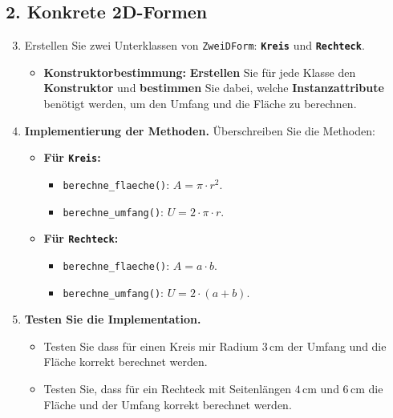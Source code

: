 \begin{myexercise}
    \subsection*{2. Konkrete 2D-Formen}

    \begin{enumerate}
        \setcounter{enumi}{2} %
        \item Erstellen Sie zwei Unterklassen von \texttt{ZweiDForm}: \textbf{\texttt{Kreis}} und \textbf{\texttt{Rechteck}}.
            \begin{itemize}
                \item \textbf{Konstruktorbestimmung:} \textbf{Erstellen} Sie für jede Klasse den \textbf{Konstruktor} und \textbf{bestimmen} Sie dabei, welche \textbf{Instanzattribute} benötigt werden, um den Umfang und die Fläche zu berechnen.
            \end{itemize}

        \item \textbf{Implementierung der Methoden.} Überschreiben Sie die Methoden:
            \begin{itemize}
                \item \textbf{Für \texttt{Kreis}:}
                    \begin{itemize}
                        \item \texttt{berechne\_flaeche()}: $A = \pi \cdot r^2$.
                        \item \texttt{berechne\_umfang()}: $U = 2 \cdot \pi \cdot r$.
                    \end{itemize}
                \item \textbf{Für \texttt{Rechteck}:}
                    \begin{itemize}
                        \item \texttt{berechne\_flaeche()}: $A = a \cdot b$.
                        \item \texttt{berechne\_umfang()}: $U = 2 \cdot (a + b)$.
                    \end{itemize}
            \end{itemize}

        \item \textbf{Testen Sie die Implementation.}
            \begin{itemize}
                \item Testen Sie dass für einen Kreis mir Radium $3\,\text{cm}$ der Umfang und die Fläche korrekt berechnet werden.
                \item Testen Sie, dass für ein Rechteck mit Seitenlängen $4\,\text{cm}$ und $6\,\text{cm}$ die Fläche und der Umfang korrekt berechnet werden.
            \end{itemize}
    \end{enumerate}


\end{myexercise}
